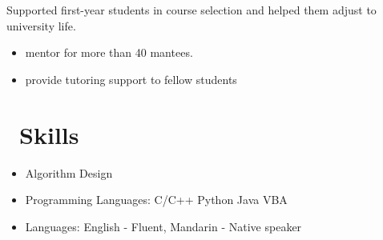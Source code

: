 \documentclass{resume}
\begin{document}
Supported first-year students in course selection and helped them adjust to university life.
\begin{itemize}
  \item mentor for more than 40 mantees.
\end{itemize}

\begin{itemize}
  \item provide tutoring support to fellow students
\end{itemize}

\section{\faCogs\ Skills}
\begin{itemize}[parsep=0.5ex]
  \item Algorithm Design
  \item Programming Languages: C/C++ Python Java VBA
  \item Languages: English - Fluent, Mandarin - Native speaker
\end{itemize}



%
%
\end{document}
